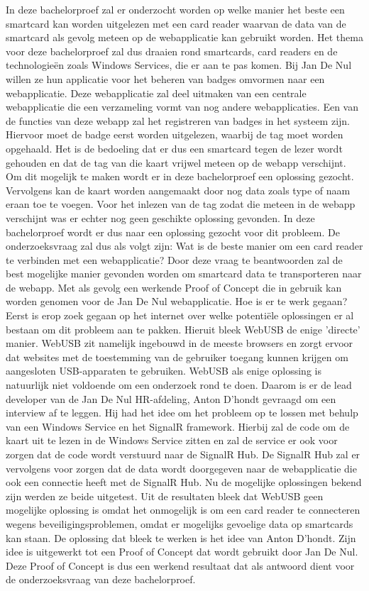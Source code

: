 In deze bachelorproef zal er onderzocht worden op welke manier het beste een smartcard kan worden uitgelezen met een card reader waarvan de data van de smartcard als gevolg meteen op de webapplicatie kan gebruikt worden. Het thema voor deze bachelorproef zal dus draaien rond smartcards, card readers en de technologieën zoals Windows Services, die er aan te pas komen. Bij Jan De Nul willen ze hun applicatie voor het beheren van badges omvormen naar een webapplicatie. Deze webapplicatie zal deel uitmaken van een centrale webapplicatie die een verzameling vormt van nog andere webapplicaties. Een van de functies van deze webapp zal het registreren van badges in het systeem zijn. Hiervoor moet de badge eerst worden uitgelezen, waarbij de tag moet worden opgehaald. Het is de bedoeling dat er dus een smartcard tegen de lezer wordt gehouden en dat de tag van die kaart vrijwel meteen op de webapp verschijnt. Om dit mogelijk te maken wordt er in deze bachelorproef een oplossing gezocht. Vervolgens kan de kaart worden aangemaakt door nog data zoals type of naam eraan toe te voegen.
Voor het inlezen van de tag zodat die meteen in de webapp verschijnt was er echter nog geen geschikte oplossing gevonden. In deze bachelorproef wordt er dus naar een oplossing gezocht voor dit probleem. De onderzoeksvraag zal dus als volgt zijn: Wat is de beste manier om een card reader te verbinden met een webapplicatie? Door deze vraag te beantwoorden zal de best mogelijke manier gevonden worden om smartcard data te transporteren naar de webapp. Met als gevolg een werkende Proof of Concept die in gebruik kan worden genomen voor de Jan De Nul webapplicatie.
Hoe is er te werk gegaan? Eerst is erop zoek gegaan op het internet over welke potentiële oplossingen er al bestaan om dit probleem aan te pakken. Hieruit bleek WebUSB de enige 'directe' manier. WebUSB zit namelijk ingebouwd in de meeste browsers en zorgt ervoor dat websites met de toestemming van de gebruiker toegang kunnen krijgen om aangesloten USB-apparaten te gebruiken. WebUSB als enige oplossing is natuurlijk niet voldoende om een onderzoek rond te doen. Daarom is er de lead developer van de Jan De Nul HR-afdeling, Anton D'hondt gevraagd om een interview af te leggen. Hij had het idee om het probleem op te lossen met behulp van een Windows Service en het SignalR framework. Hierbij zal de code om de kaart uit te lezen in de Windows Service zitten en zal de service er ook voor zorgen dat de code wordt verstuurd naar de SignalR Hub. De SignalR Hub zal er vervolgens voor zorgen dat de data wordt doorgegeven naar de webapplicatie die ook een connectie heeft met de SignalR Hub. Nu de mogelijke oplossingen bekend zijn werden ze beide uitgetest. 
Uit de resultaten bleek dat WebUSB geen mogelijke oplossing is omdat het onmogelijk is om een card reader te connecteren wegens beveiligingsproblemen, omdat er mogelijks gevoelige data op smartcards kan staan. De oplossing dat bleek te werken is het idee van Anton D'hondt. Zijn idee is uitgewerkt tot een Proof of Concept dat wordt gebruikt door Jan De Nul. Deze Proof of Concept is dus een werkend resultaat dat als antwoord dient voor de onderzoeksvraag van deze bachelorproef.
